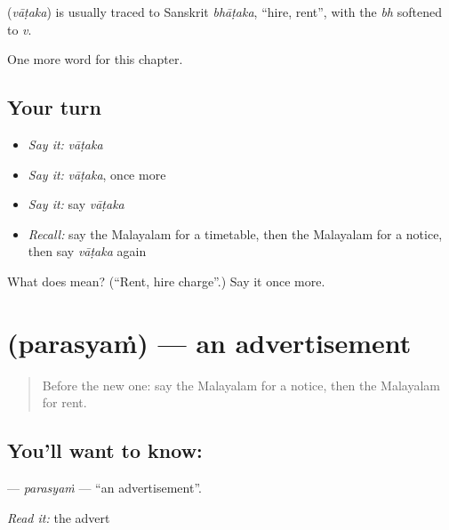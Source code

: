 \begin{cousinweb}
\textbf{} (\emph{vāṭaka}) is usually traced to Sanskrit \emph{bhāṭaka}, \textquotedblleft{}hire, rent\textquotedblright{}, with the \emph{bh} softened to \emph{v}.
\end{cousinweb}

\begin{grammarlens}[title={What you've built}]
One more word for this chapter.
\end{grammarlens}

\subsection*{Your turn}
\begin{itemize}
\raggedright
  \item \emph{Say it:} \emph{vāṭaka}
  \item \emph{Say it:} \emph{vāṭaka}, once more
  \item \emph{Say it:} say \emph{vāṭaka}
  \item \emph{Recall:} say the Malayalam for a timetable, then the Malayalam for a notice, then say \emph{vāṭaka} again
\end{itemize}

\begin{tcolorbox}[breakable,colback=teal!4,colframe=teal!35!black,title={Before you move on}]
What does  mean? (\textquotedblleft{}Rent, hire charge\textquotedblright{}.) Say it once more.
\end{tcolorbox}
\section[\texorpdfstring{\ml{പരസ്യം} (parasyaṁ)}{പരസ്യം (parasyaṁ)}]{ (parasyaṁ) — an advertisement}

\label{lesson:ML-C180-parasyam}



\begin{quote}
Before the new one: say the Malayalam for a notice, then the Malayalam for rent.
\end{quote}

\subsection*{You'll want to know: }
\textbf{} — \emph{parasyaṁ} — \textquotedblleft{}an advertisement\textquotedblright{}.

\emph{Read it:} the advert

